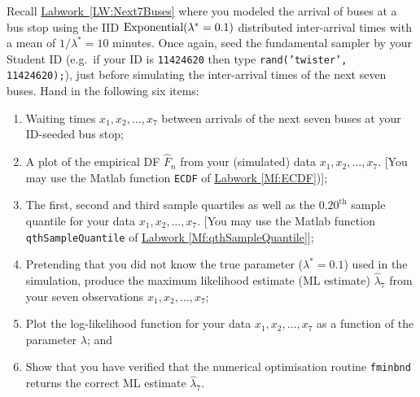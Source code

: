 {\begin{labwork}\label{LW:ExponentialBusMLE}
Recall \hyperref[LW:Next7Buses]{Labwork~\ref*{LW:Next7Buses}} where you modeled the arrival of buses at a bus stop using the IID $\mbox{{\rm Exponential}}(\lambda^*=0.1)$ distributed inter-arrival times with a mean of $1/\lambda^*=10$ minutes.  Once again, seed the fundamental sampler by your Student ID (e.g.~if your ID is {\tt 11424620} then type {\tt rand('twister', 11424620);}), just before simulating the inter-arrival times of the next seven buses.  Hand in the following six items:
\begin{enumerate}
\item Waiting times $x_1,x_2,\ldots,x_7$ between arrivals of the next seven buses at your ID-seeded bus stop;
\item A plot of the empirical DF $\widehat{F}_n$  from your (simulated) data $x_1,x_2,\ldots,x_7$.  [You may use the {\sc Matlab} function {\tt ECDF} of  \hyperref[Mf:ECDF]{Labwork \ref*{Mf:ECDF}})];
\item The first, second and third sample quartiles as well as the $0.20^{\text{th}}$ sample quantile for your data $x_1,x_2,\ldots,x_7$.  [You may use the {\sc Matlab} function {\tt qthSampleQuantile} of \hyperref[Mf:qthSampleQuantile]{Labwork \ref*{Mf:qthSampleQuantile}}];
\item Pretending that you did not know the true parameter ($\lambda^*=0.1$) used in the simulation, produce the maximum likelihood estimate (ML estimate) $\widehat{\lambda}_7$ from your seven observations $x_1,x_2,\ldots,x_7$;
\item Plot the log-likelihood function for your data $x_1,x_2,\ldots,x_7$ as a function of the parameter $\lambda$; and
\item Show that you have verified that the numerical optimisation routine {\tt fminbnd} returns the correct ML estimate $\widehat{\lambda}_7$.
\end{enumerate}
 \end{labwork}
 
}
